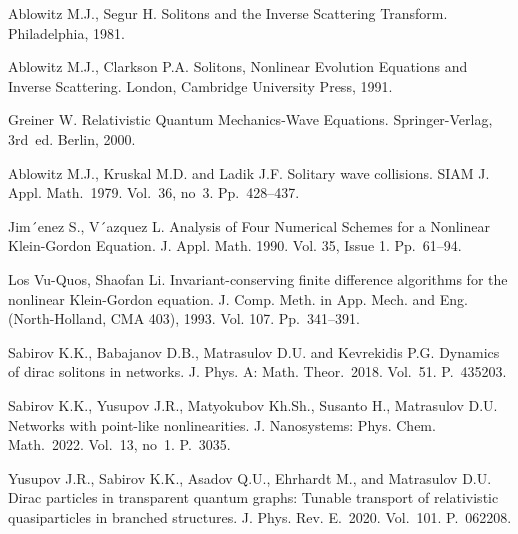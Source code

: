 \documentclass[12pt]{llncs}
\begin{document}
\begin{thebibliography}{9} %

 Ablowitz M.J., Segur H. Solitons and the Inverse Scattering Transform. Philadelphia, 1981.

 Ablowitz M.J., Clarkson P.A. Solitons, Nonlinear Evolution Equations and Inverse Scattering. London, Cambridge University Press, 1991.

 Greiner W. Relativistic Quantum Mechanics-Wave Equations. Springer-Verlag, 3rd~ed. Berlin, 2000.

 Ablowitz M.J., Kruskal M.D. and Ladik J.F. Solitary wave collisions. SIAM J. Appl. Math.~1979. Vol.~36, no~3. Pp.~428--437.

 Jim´enez S., V´azquez L. Analysis of Four Numerical Schemes for a Nonlinear Klein-Gordon Equation. J. Appl. Math. 1990. Vol. 35, Issue 1. Pp.~61--94.

 Los Vu-Quos, Shaofan Li. Invariant-conserving finite difference algorithms for the nonlinear Klein-Gordon equation. J. Comp. Meth. in App. Mech. and Eng. (North-Holland, CMA 403), 1993. Vol. 107. Pp.~341--391.

 Sabirov K.K., Babajanov D.B., Matrasulov D.U. and Kevrekidis P.G. Dynamics of dirac solitons in networks. J. Phys. A: Math. Theor.~2018. Vol.~51. P.~435203.

 Sabirov K.K., Yusupov J.R., Matyokubov Kh.Sh., Susanto H., Matrasulov D.U. Networks with point-like nonlinearities. J. Nanosystems: Phys. Chem. Math.~2022. Vol.~13, no~1. P.~3035.

 Yusupov J.R., Sabirov K.K., Asadov Q.U., Ehrhardt M., and Matrasulov D.U. Dirac particles in transparent quantum graphs: Tunable transport of relativistic quasiparticles in branched structures. J. Phys. Rev. E.~2020. Vol.~101. P.~062208.      
\end{thebibliography}

\end{document}
